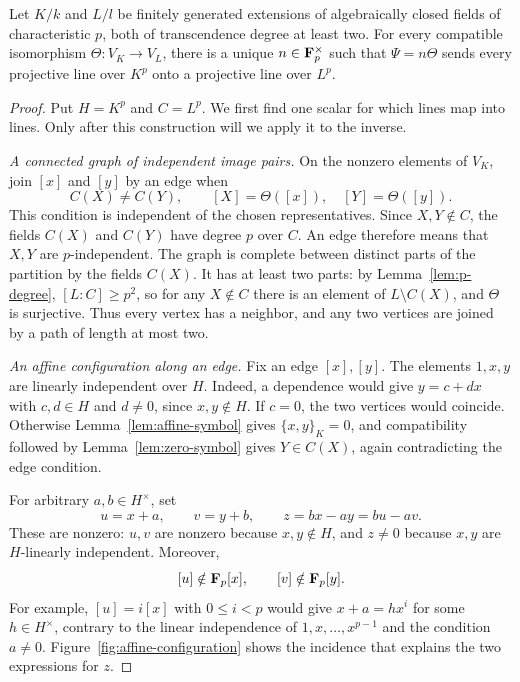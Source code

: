 \begin{proposition}\label{prop:lines}
Let $K/k$ and $L/l$ be finitely generated extensions of algebraically
closed fields of characteristic $p$, both of transcendence degree at
least two.  For every compatible isomorphism $\Theta:V_K\to V_L$, there
is a unique $n\in\mathbf F_p^\times$ such that $\Psi=n\Theta$ sends every
projective line over $K^p$ onto a projective line over $L^p$.
\end{proposition}
\begin{proof}
Put $H=K^p$ and $C=L^p$.  We first find one scalar for which lines map
into lines.  Only after this construction will we apply it to the inverse.

\smallskip
\noindent\emph{A connected graph of independent image pairs.}
On the nonzero elements of $V_K$, join $[x]$ and $[y]$ by an edge when
\[
 C(X)\ne C(Y),\qquad [X]=\Theta([x]),\quad [Y]=\Theta([y]).
\]
This condition is independent of the chosen representatives.  Since
$X,Y\notin C$, the fields $C(X)$ and $C(Y)$ have degree $p$ over $C$.
An edge therefore means that $X,Y$ are $p$-independent.
The graph is complete between distinct parts of the partition by the
fields $C(X)$.  It has at least two parts: by Lemma~\ref{lem:p-degree},
$[L:C]\ge p^2$, so for any $X\notin C$ there is an element of
$L\setminus C(X)$, and $\Theta$ is surjective.  Thus every vertex has a
neighbor, and any two vertices are joined by a path of length at most two.

\smallskip
\noindent\emph{An affine configuration along an edge.}
Fix an edge $[x],[y]$.  The elements $1,x,y$ are linearly independent
over $H$.  Indeed, a dependence would give $y=c+dx$ with $c,d\in H$
and $d\ne0$, since $x,y\notin H$.  If $c=0$, the two vertices would
coincide.  Otherwise Lemma~\ref{lem:affine-symbol} gives
$\{x,y\}_K=0$, and compatibility followed by
Lemma~\ref{lem:zero-symbol} gives $Y\in C(X)$, again contradicting
the edge condition.

For arbitrary $a,b\in H^\times$, set
\begin{equation}\label{eq:affine-configuration}
 u=x+a,\qquad v=y+b,\qquad z=bx-ay=bu-av.
\end{equation}
These are nonzero: $u,v$ are nonzero because $x,y\notin H$, and
$z\ne0$ because $x,y$ are $H$-linearly independent.  Moreover,
\begin{equation}\label{eq:nonmonomial-source}
 [u]\notin\mathbf F_p[x],\qquad [v]\notin\mathbf F_p[y].
\end{equation}
For example, $[u]=i[x]$ with $0\le i<p$ would give
$x+a=h x^i$ for some $h\in H^\times$, contrary to the linear
independence of $1,x,\ldots,x^{p-1}$ and the condition $a\ne0$.
Figure~\ref{fig:affine-configuration} shows the incidence that explains
the two expressions for $z$.


\end{proof}
